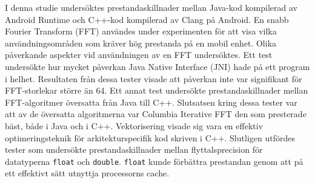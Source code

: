 I denna studie undersöktes prestandaskillnader mellan Java-kod kompilerad av Android Runtime och C++-kod kompilerad av Clang på Android. En snabb Fourier Transform (FFT) användes under experimenten för att visa vilka användningsområden som kräver hög prestanda på en mobil enhet. Olika påverkande aspekter vid användningen av en FFT undersöktes. Ett test undersökte hur mycket påverkan Java Native Interface (JNI) hade på ett program i helhet. Resultaten från dessa tester visade att påverkan inte var signifikant för FFT-storlekar större än 64. Ett annat test undersökte prestandaskillnader mellan FFT-algoritmer översatta från Java till C++. Slutsatsen kring dessa tester var att av de översatta algoritmerna var Columbia Iterative FFT den som presterade bäst, både i Java och i C++. Vektorisering visade sig vara en effektiv optimeringsteknik för arkitekturspecifik kod skriven i C++. Slutligen utfördes tester som undersökte prestandaskillnader mellan flyttalsprecision för datatyperna \texttt{float} och \texttt{double}. \texttt{float} kunde förbättra prestandan genom att på ett effektivt sätt utnyttja processorns cache.
